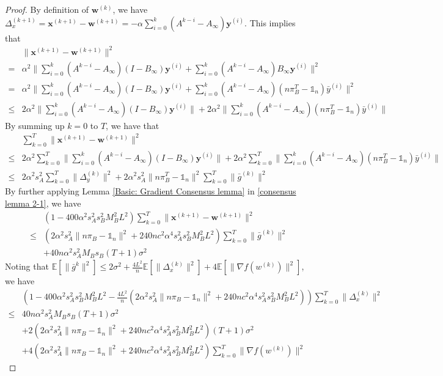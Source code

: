 \documentclass{article}
\newcommand{\vw}{{\mathbf{w}}}
\newcommand{\vx}{{\mathbf{x}}}
\newcommand{\vy}{{\mathbf{y}}}
\newcommand{\EE}[1]{\mathbb{E}\left[#1\right]}
\newcommand{\norm}[1]{\| #1 \|}
\newcommand{\one}{\mathds{1}_n}
\begin{document}
\begin{proof}
By definition of $\vw^{(k)}$, we have $\Delta_{x}^{(k+1)}=\vx^{(k+1)}-\vw^{(k+1)}=-\alpha\sum_{i=0}^k(A^{k-i}-A_{\infty})\vy^{(i)}$. This implies that
\begin{align*}
&\norm{\vx^{(k+1)}-\vw^{(k+1)}}^2\\ 
=&\alpha^2 \norm{\sum_{i=0}^k(A^{k-i}-A_{\infty})(I-B_{\infty})\vy^{(i)}+\sum_{i=0}^k(A^{k-i}-A_{\infty})B_{\infty}\vy^{(i)}}^2\\ 
=&\alpha^2 \norm{\sum_{i=0}^k(A^{k-i}-A_{\infty})(I-B_{\infty})\vy^{(i)}+\sum_{i=0}^k(A^{k-i}-A_{\infty})(n\pi_{B}^T-\one)\bar{y}^{(i)}}^2\\ 
\leq&2\alpha^2\norm{\sum_{i=0}^k(A^{k-i}-A_{\infty})(I-B_{\infty})\vy^{(i)}}+2\alpha^2\norm{\sum_{i=0}^k(A^{k-i}-A_{\infty})(n\pi_{B}^T-\one)\bar{y}^{(i)}}
\end{align*}
By summing up $k=0$ to $T$, we have that
\begin{align}
&\sum_{k=0}^T\norm{\vx^{(k+1)}-\vw^{(k+1)}}^2\nonumber\\ 
\leq& 2\alpha^2\sum_{k=0}^T\norm{\sum_{i=0}^k(A^{k-i}-A_{\infty})(I-B_{\infty})\vy^{(i)}}+2\alpha^2\sum_{k=0}^T\norm{\sum_{i=0}^k(A^{k-i}-A_{\infty})(n\pi_{B}^T-\one)\bar{y}^{(i)}}\nonumber\\ 
\leq& 2\alpha^2s_{A}^2\sum_{k=0}^T \norm{\Delta_{y}^{(k)}}^2+2\alpha^2s_{A}^2\norm{n\pi_{B}^T-\one}^2\sum_{k=0}^T\norm{\bar{g}^{(k)}}^2\label{consensus lemma 2-1}
\end{align}
By further applying Lemma \ref{Basic: Gradient Consensus lemma} in \ref{consensus lemma 2-1}, we have
\begin{align}
  &\left(1-400\alpha^2s_A^2s_B^2M_B^2L^2\right)\sum_{k=0}^T\norm{\vx^{(k+1)}-\vw^{(k+1)}}^2\nonumber\\ 
  \leq &\left(2\alpha^2s_A^2\norm{n\pi_B-\one}^2+240nc^2\alpha^4s_A^2s_B^2M_B^2L^2\right) \sum_{k=0}^T\norm{\bar{g}^{(k)}}^2\nonumber\\ &+40n\alpha^2s_A^2M_Bs_B(T+1)\sigma^2\label{consensus lemma 2-2}
\end{align}
Noting that $\EE{\norm{\bar{g}^{k}}^2}\leq 2\sigma^2+\frac{4L^2}{n}\EE{\norm{\Delta_x^{(k)}}^2}+4\EE{\norm{\nabla f(w^{(k)})}^2}$, we have
\begin{align*}
  &\left(1-400\alpha^2s_A^2s_B^2M_B^2L^2-\frac{4L^2}{n}\left(2\alpha^2s_A^2\norm{n\pi_B-\one}^2+240nc^2\alpha^4s_A^2s_B^2M_B^2L^2\right)\right)\sum_{k=0}^T\norm{\Delta_x^{(k)}}^2\\ 
  \leq &40n\alpha^2s_A^2M_Bs_B(T+1)\sigma^2\\&+2\left(2\alpha^2s_A^2\norm{n\pi_B-\one}^2+240nc^2\alpha^4s_A^2s_B^2M_B^2L^2\right)(T+1)\sigma^2\\&+4\left(2\alpha^2s_A^2\norm{n\pi_B-\one}^2+240nc^2\alpha^4s_A^2s_B^2M_B^2L^2\right) \sum_{k=0}^T\norm{\nabla f(w^{(k)})}^2

\end{align*}
\end{proof}
\end{document}
